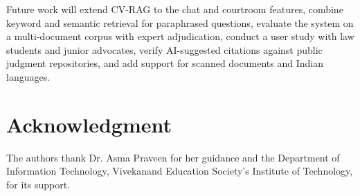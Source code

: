 \documentclass[conference]{IEEEtran}
\begin{document}
Future work will extend CV-RAG to the chat and courtroom features, combine keyword and semantic retrieval for paraphrased questions, evaluate the system on a multi-document corpus with expert adjudication, conduct a user study with law students and junior advocates, verify AI-suggested citations against public judgment repositories, and add support for scanned documents and Indian languages.

\section*{Acknowledgment}
The authors thank Dr. Asma Praveen for her guidance and the Department of Information Technology, Vivekanand Education Society's Institute of Technology, for its support.



\end{document}
